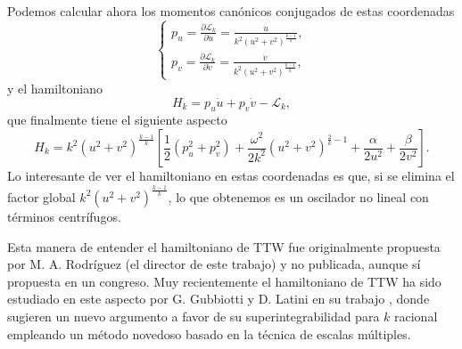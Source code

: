 \documentclass[12pt,a4paper,twoside]{article}
\theoremstyle{definition} \newtheorem{defn}[thm]{Definición}
\theoremstyle{definition} \newtheorem{ejemplo}[thm]{Ejemplo}
\theoremstyle{definition} \newtheorem{ejercicio}[thm]{Ejercicio}
\theoremstyle{remark} \newtheorem*{obs}{Observación}
\begin{document}
Podemos calcular ahora los momentos canónicos conjugados de estas coordenadas
\begin{equation}
  \begin{cases}
    p_u=\frac{\partial \mathcal{L} _k}{\partial \dot{u}}=\frac{\dot{u}}{k^2 (u^2+v^2)^{\frac{k-1}{k}}}, \\
    p_v=\frac{\partial \mathcal{L} _k}{\partial \dot{v}}=\frac{\dot{v}}{k^2 (u^2+v^2)^{\frac{k-1}{k}}},
  \end{cases}
\end{equation}
y el hamiltoniano
\begin{equation*}
  H_k=p_u \dot{u} + p_v \dot{v} - \mathcal{L}_k,
\end{equation*}
que finalmente tiene el siguiente aspecto
\begin{equation}
  H_k = k^2 (u^2+v^2)^{\frac{k-1}{k}}\left[ \frac{1}{2}(p_u^2+p_v^2)+ \frac{\omega^2}{2k^2}(u^2+v^2)^{\frac{2}{k}-1}+\frac{\alpha}{2u^2}+\frac{\beta}{2 v^2} \right]. 
\end{equation}
Lo interesante de ver el hamiltoniano en estas coordenadas es que, si se elimina el factor global $k^2(u^2+v^2)^{\frac{k-1}{k}}$, lo que obtenemos es un oscilador no lineal con términos centrífugos.

Esta manera de entender el hamiltoniano de TTW fue originalmente propuesta por M. A. Rodríguez (el director de este trabajo) y no publicada, aunque sí propuesta en un congreso. Muy recientemente el hamiltoniano de TTW ha sido estudiado en este aspecto por G. Gubbiotti y D. Latini en su trabajo \cite{gubbiottilatini}, donde sugieren un nuevo argumento a favor de su superintegrabilidad para $k$ racional empleando un método novedoso basado en la técnica de escalas múltiples.

\nocite{*}


\end{document}
